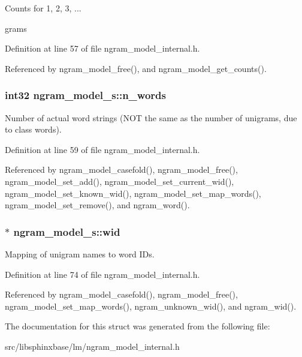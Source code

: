 Counts for 1, 2, 3, ... 

grams 

Definition at line 57 of file ngram\+\_\+model\+\_\+internal.\+h.



Referenced by ngram\+\_\+model\+\_\+free(), and ngram\+\_\+model\+\_\+get\+\_\+counts().

\subsubsection[{n\+\_\+words}]{\setlength{\rightskip}{0pt plus 5cm}int32 ngram\+\_\+model\+\_\+s\+::n\+\_\+words}\label{structngram__model__s_a74f85927ef0d5513a1e6c02d13864be3}


Number of actual word strings (N\+O\+T the same as the number of unigrams, due to class words). 



Definition at line 59 of file ngram\+\_\+model\+\_\+internal.\+h.



Referenced by ngram\+\_\+model\+\_\+casefold(), ngram\+\_\+model\+\_\+free(), ngram\+\_\+model\+\_\+set\+\_\+add(), ngram\+\_\+model\+\_\+set\+\_\+current\+\_\+wid(), ngram\+\_\+model\+\_\+set\+\_\+known\+\_\+wid(), ngram\+\_\+model\+\_\+set\+\_\+map\+\_\+words(), ngram\+\_\+model\+\_\+set\+\_\+remove(), and ngram\+\_\+word().

\subsubsection[{wid}]{$\ast$ ngram\+\_\+model\+\_\+s\+::wid}\label{structngram__model__s_a75567419a8002ef6e916c81f5d9ee9ed}


Mapping of unigram names to word I\+Ds. 



Definition at line 74 of file ngram\+\_\+model\+\_\+internal.\+h.



Referenced by ngram\+\_\+model\+\_\+casefold(), ngram\+\_\+model\+\_\+free(), ngram\+\_\+model\+\_\+set\+\_\+map\+\_\+words(), ngram\+\_\+unknown\+\_\+wid(), and ngram\+\_\+wid().



The documentation for this struct was generated from the following file\+:\begin{DoxyCompactItemize}
\item 
src/libsphinxbase/lm/ngram\+\_\+model\+\_\+internal.\+h\end{DoxyCompactItemize}
